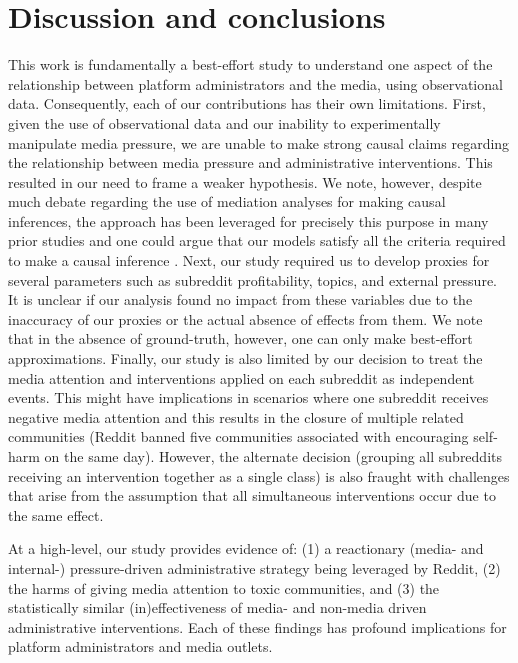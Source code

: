 \section{Discussion and conclusions} \label{sec:discussion}

 This work is fundamentally a best-effort
study to understand one aspect of the relationship between platform
administrators and the media, using observational data. Consequently, each of
our contributions has their own limitations. First, given the use of
observational data and our inability to experimentally manipulate media
pressure, we are unable to make strong causal claims regarding the relationship
between media pressure and administrative interventions. This resulted in our
need to frame a weaker hypothesis. We note, however, despite much debate
regarding the use of mediation analyses for making causal inferences, the
approach has been leveraged for precisely this purpose in many prior studies
and one could argue that our models satisfy all the criteria required to make
a causal inference \cite{pearl2014interpretation, Pieters-JCR2017}. Next, our
study required us to develop proxies for several parameters such as subreddit
profitability, topics, and external pressure. It is unclear if our analysis
found no impact from these variables due to the inaccuracy of our proxies or
the actual absence of effects from them. We note that in the absence of
ground-truth, however, one can only make best-effort approximations. Finally,
our study is also limited by our decision to treat the
media attention and interventions applied on each subreddit as independent
events. This might have implications in scenarios where one subreddit receives
negative media attention and this results in the closure of multiple related
communities (\eg Reddit banned five communities  associated with encouraging
self-harm on the same day). However, the alternate decision (grouping all
subreddits receiving an intervention together as a single class) is also
fraught with challenges that arise from the assumption that all
simultaneous interventions occur due to the same effect.

 At a high-level, our study provides evidence
of: (1) a reactionary (media- and internal-) pressure-driven administrative
strategy being leveraged by Reddit, (2) the harms of giving media attention to
toxic communities, and (3) the statistically similar (in)effectiveness of
media- and non-media driven administrative interventions. Each of these
findings has profound implications for platform administrators and media
outlets. 

